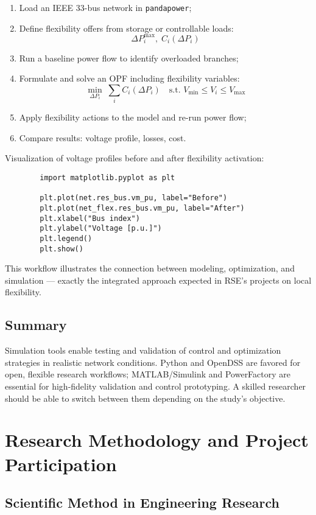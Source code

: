 \documentclass[11pt]{article}
\begin{document}
	\begin{enumerate}
		\item Load an IEEE 33-bus network in \texttt{pandapower};
		\item Define flexibility offers from storage or controllable loads:
		\[
		\Delta P_i^\text{max}, \; C_i(\Delta P_i)
		\]
		\item Run a baseline power flow to identify overloaded branches;
		\item Formulate and solve an OPF including flexibility variables:
		\[
		\min_{\Delta P_i} \; \sum_i C_i(\Delta P_i)
		\quad \text{s.t. } V_\text{min} \le V_i \le V_\text{max}
		\]
		\item Apply flexibility actions to the model and re-run power flow;
		\item Compare results: voltage profile, losses, cost.
	\end{enumerate}
	
	Visualization of voltage profiles before and after flexibility activation:
	\begin{verbatim}
		import matplotlib.pyplot as plt
		
		plt.plot(net.res_bus.vm_pu, label="Before")
		plt.plot(net_flex.res_bus.vm_pu, label="After")
		plt.xlabel("Bus index")
		plt.ylabel("Voltage [p.u.]")
		plt.legend()
		plt.show()
	\end{verbatim}
	
	This workflow illustrates the connection between modeling, optimization, and simulation — exactly the integrated approach expected in RSE’s projects on local flexibility.
	
	\subsection*{Summary}
	
	Simulation tools enable testing and validation of control and optimization strategies in realistic network conditions.  
	Python and OpenDSS are favored for open, flexible research workflows;  
	MATLAB/Simulink and PowerFactory are essential for high-fidelity validation and control prototyping.  
	A skilled researcher should be able to switch between them depending on the study’s objective.
	
	
	\section{Research Methodology and Project Participation}
	\subsection{Scientific Method in Engineering Research}
\end{document}
